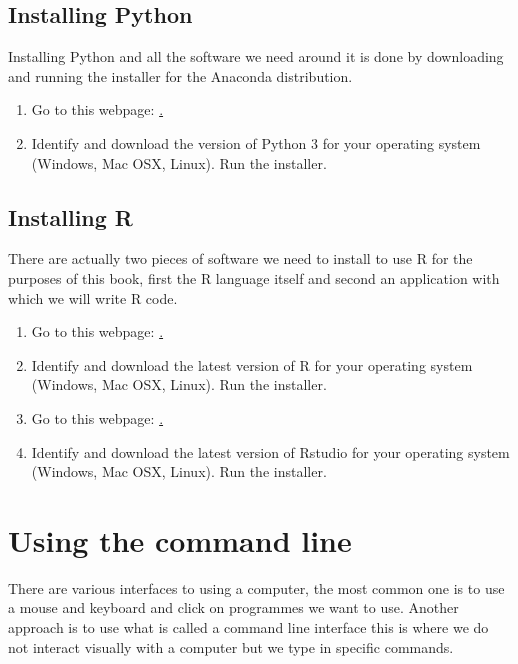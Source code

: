 \subsection{Installing Python}\label{sec:installing-python}

Installing Python and all the software we need around it is done by downloading
and running the installer for the Anaconda distribution.

\begin{enumerate}
    \item Go to this webpage: \href{https://www.anaconda.com/download/}.
    \item Identify and download the version of Python 3 for your operating system
        (Windows, Mac OSX, Linux). Run the installer.
\end{enumerate}

\subsection{Installing R}\label{sec:installing-R}

There are actually two pieces of software we need to install to use R for the
purposes of this book, first the R language itself and second an application
with which we will write R code.

\begin{enumerate}
    \item Go to this webpage: \href{https://cran.r-project.org}.
    \item Identify and download the latest version of R for your operating system
        (Windows, Mac OSX, Linux). Run the installer.
    \item Go to this webpage: \href{https://rstudio.com}.
    \item Identify and download the latest version of Rstudio for your operating system
        (Windows, Mac OSX, Linux). Run the installer.
\end{enumerate}

\section{Using the command line}\label{sec:using-the-command-line}

There are various interfaces to using a computer, the most common one is to use
a mouse and keyboard and click on programmes we want to use. Another approach is
to use what is called a command line interface this is where we do not interact
visually with a computer but we type in specific commands.

